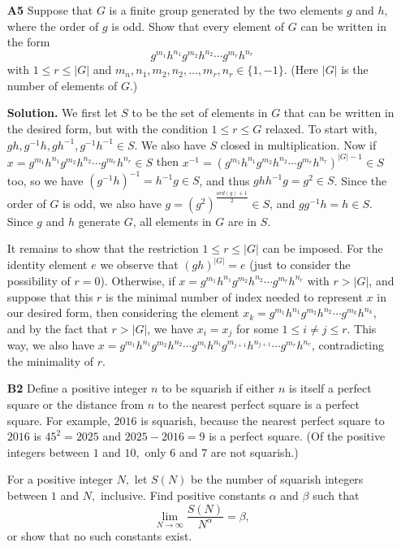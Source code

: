 \documentclass[11pt,a4paper]{article}
\begin{document}
\begin{enumerate}
	\item[\textbf{A5}]Suppose that $G$ is a finite group generated by the two elements $g$ and $h,$ where the order of $g$ is odd. Show that every element of $G$ can be written in the form
	\[g^{m_1}h^{n_1}g^{m_2}h^{n_2}\cdots g^{m_r}h^{n_r}\]with $1\le r\le |G|$ and $m_n,n_1,m_2,n_2,\dots,m_r,n_r\in\{1,-1\}.$ (Here $|G|$ is the number of elements of $G.$)
	
	\textbf{Solution.} We first let $S$ to be the set of elements in $G$ that can be written in the desired form, but with the condition $1\le r\le G$ relaxed. To start with, $gh, g^{-1}h, gh^{-1}, g^{-1}h^{-1}\in S$. We also have $S$ closed in multiplication. 
	Now if $x=g^{m_1}h^{n_1}g^{m_2}h^{n_2}\cdots g^{m_r}h^{n_r}\in S$ then $x^{-1}=(g^{m_1}h^{n_1}g^{m_2}h^{n_2}\cdots g^{m_r}h^{n_r})^{|G|-1}\in S$ too, so we have $(g^{-1}h)^{-1}=h^{-1}g\in S$, and thus $ghh^{-1}g=g^2\in S$. Since the order of $G$ is odd, we also have $g=(g^2)^{\frac{ord(g)+1}{2}}\in S$, and $gg^{-1}h=h\in S$. Since $g$ and $h$ generate $G$, all elements in $G$ are in $S$. 
	
	It remains to show that the restriction $1\le r\le |G|$ can be imposed. For the identity element $e$ we observe that $(gh)^|G|=e$ (just to consider the possibility of $r=0$). Otherwise, if $x=g^{m_1}h^{n_1}g^{m_2}h^{n_2}\cdots g^{m_r}h^{n_r}$ with $r>|G|$, and suppose that this $r$ is the minimal number of index needed to represent $x$ in our desired form, then considering the element $x_k=g^{m_1}h^{n_1}g^{m_2}h^{n_2}\cdots g^{m_k}h^{n_k}$, and by the fact that $r>|G|$, we have $x_i=x_j$ for some $1\le i\neq j\le r$. This way, we also have 
	$x=g^{m_1}h^{n_1}g^{m_2}h^{n_2}\cdots g^{m_i}h^{n_i}g^{m_{j+1}}h^{n_{j+1}}\cdots g^{m_r}h^{n_r}$, contradicting the minimality of $r$. 
	
	\item[\textbf{B2}]Define a positive integer $n$ to be squarish if either $n$ is itself a perfect square or the distance from $n$ to the nearest perfect square is a perfect square. For example, $2016$ is squarish, because the nearest perfect square to $2016$ is $45^2=2025$ and $2025-2016=9$ is a perfect square. (Of the positive integers between $1$ and $10,$ only $6$ and $7$ are not squarish.)
	
	For a positive integer $N,$ let $S(N)$ be the number of squarish integers between $1$ and $N,$ inclusive. Find positive constants $\alpha$ and $\beta$ such that
	\[\lim_{N\to\infty}\frac{S(N)}{N^{\alpha}}=\beta,\]or show that no such constants exist.
	

\end{enumerate}
\end{document}
